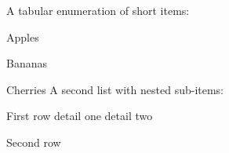 \documentclass{article}
\begin{document}
A tabular enumeration of short items:
\tabenum
\item Apples \item Bananas \item Cherries
\endtabenum
A second list with nested sub-items:
\tabenum
\item First row \subitem detail one \subitem detail two
\item Second row
\endtabenum
\end{document}
